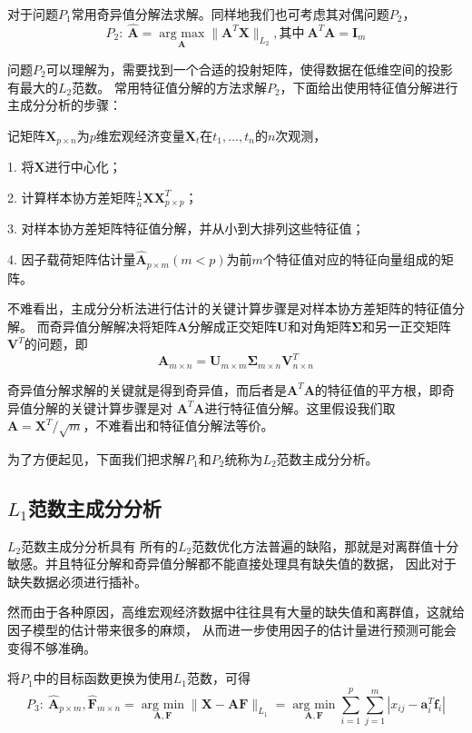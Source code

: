 对于问题$P_1$常用奇异值分解法求解。同样地我们也可考虑其对偶问题$P_2$，
\begin{equation}\label{pca-l2-p2}
P_2: \ \hat{\bm{A}} = \underset{\bm{A}}{\operatorname{arg\ max}} \| \bm{A}^T \bm{X}\|_{L_2}, \text{其中}\ \bm{A}^T
\bm{A} = \bm{I}_m
\end{equation}

问题$P_2$可以理解为，需要找到一个合适的投射矩阵，使得数据在低维空间的投影有最大的$L_2$范数。
常用特征值分解的方法求解$P_2$，下面给出使用特征值分解进行主成分分析的步骤：

记矩阵$\bm{X}_{p\times n}$为$p$维宏观经济变量$\bm{X}_t$在$t_1, ..., t_n$的$n$次观测，

1. 将$\bm{X}$进行中心化；

2. 计算样本协方差矩阵$\frac1{n}\bm{X}\bm{X}^T_{p\times p}$；

3. 对样本协方差矩阵特征值分解，并从小到大排列这些特征值；

4. 因子载荷矩阵估计量$\hat{\bm{A}}_{p\times m} (m < p)$为前$m$个特征值对应的特征向量组成的矩阵。

不难看出，主成分分析法进行估计的关键计算步骤是对样本协方差矩阵的特征值分解。
而奇异值分解解决将矩阵$\bm{A}$分解成正交矩阵$\bm{U}$和对角矩阵$\bm{\Sigma}$和另一正交矩阵$\bm{V}^T$的问题，即
$$
    \bm{A}_{m \times n} = \bm{U}_{m \times m}\bm{\Sigma}_{m \times n}\bm{V}_{n \times n}^T
$$

奇异值分解求解的关键就是得到奇异值，而后者是$\bm{A}^T\bm{A}$的特征值的平方根，即奇异值分解的关键计算步骤是对
$\bm{A}^T\bm{A}$进行特征值分解。这里假设我们取$\bm{A} = {\bm{X}^T}/{\sqrt{m}}$，不难看出和特征值分解法等价。

为了方便起见，下面我们把求解$P_1$和$P_2$统称为$L_2$范数主成分分析。

\subsection{$L_1$范数主成分分析}

$L_2$范数主成分分析具有
所有的$L_2$范数优化方法普遍的缺陷，那就是对离群值十分敏感。并且特征分解和奇异值分解都不能直接处理具有缺失值的数据，
因此对于缺失数据必须进行插补。

然而由于各种原因，高维宏观经济数据中往往具有大量的缺失值和离群值，这就给因子模型的估计带来很多的麻烦，
从而进一步使用因子的估计量进行预测可能会变得不够准确。

将$P_1$中的目标函数更换为使用$L_1$范数，可得
\begin{equation}\label{p3}
    P_3: \ 
\hat{\bm{A}}_{p\times m}, \hat{\bm{F}}_{m\times n} = \underset{\bm{A},\bm{F}}{\operatorname{arg\ min} } \|\bm X - \bm{A}\bm{F}\|_{L_1}
= \underset{\bm{A}, \bm{F}}{\operatorname{arg\ min}} \sum_{i=1}^p \sum_{j=1}^m |x_{ij} - \bm a_i^T \bm f_i| 
\end{equation}

